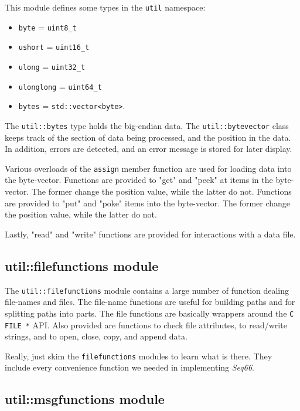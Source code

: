    This module defines some types in the \texttt{util} namespace:

   \begin{itemize}
      \item \texttt{byte} = \texttt{uint8\_t}
      \item \texttt{ushort} = \texttt{uint16\_t}
      \item \texttt{ulong} = \texttt{uint32\_t}
      \item \texttt{ulonglong} = \texttt{uint64\_t}
      \item \texttt{bytes} = \texttt{std::vector<byte>}.
   \end{itemize}

   The \texttt{util::bytes} type holds the big-endian data.
   The \texttt{util::bytevector} class keeps track of the
   section of data being processed, and the position in the data.
   In addition, errors are detected, and an error message is stored
   for later display.

   Various overloads of the \texttt{assign} member function are used
   for loading data into the byte-vector.
   Functions are provided to "get" and "peek" at items in the byte-vector.
   The former change the position value, while the latter do not.
   Functions are provided to "put" and "poke" items into the byte-vector.
   The former change the position value, while the latter do not.

   Lastly, "read" and "write" functions are provided for interactions
   with a data file.

\subsection{util::filefunctions module}
\label{subsec:util_namespace_filefunctions}

   The \texttt{util::filefunctions} module contains a large number of
   function dealing file-names and files.
   The file-name functions are useful for building paths and for splitting
   paths into parts.
   The file functions are basically wrappers around the \texttt{C FILE *}
   API.
   Also provided are functions to check file attributes, to read/write
   strings, and to open, close, copy, and append data.

   Really, just skim the \texttt{filefunctions} modules to learn what is
   there.  They include every convenience function we needed in implementing
   \textsl{Seq66}.

\subsection{util::msgfunctions module}
\label{subsec:util_namespace_msgfunctions}

